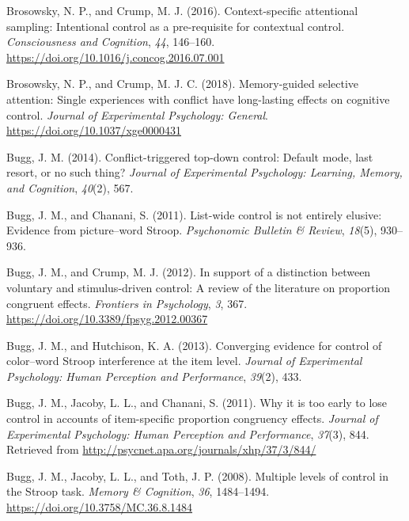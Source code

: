 \documentclass[]{DissertateCUNY}
\begin{document}
\leavevmode\hypertarget{ref-brosowsky_context-specific_2016}{}%
Brosowsky, N. P., and Crump, M. J. (2016). Context-specific attentional
sampling: Intentional control as a pre-requisite for contextual control.
\emph{Consciousness and Cognition}, \emph{44}, 146--160.
\url{https://doi.org/10.1016/j.concog.2016.07.001}

\leavevmode\hypertarget{ref-brosowsky_memory-guided_2018}{}%
Brosowsky, N. P., and Crump, M. J. C. (2018). Memory-guided selective
attention: Single experiences with conflict have long-lasting effects on
cognitive control. \emph{Journal of Experimental Psychology: General}.
\url{https://doi.org/10.1037/xge0000431}

\leavevmode\hypertarget{ref-bugg_conflict-triggered_2014}{}%
Bugg, J. M. (2014). Conflict-triggered top-down control: Default mode,
last resort, or no such thing? \emph{Journal of Experimental Psychology:
Learning, Memory, and Cognition}, \emph{40}(2), 567.

\leavevmode\hypertarget{ref-bugg_list-wide_2011}{}%
Bugg, J. M., and Chanani, S. (2011). List-wide control is not entirely
elusive: Evidence from picture--word Stroop. \emph{Psychonomic Bulletin
\& Review}, \emph{18}(5), 930--936.

\leavevmode\hypertarget{ref-bugg_support_2012}{}%
Bugg, J. M., and Crump, M. J. (2012). In support of a distinction
between voluntary and stimulus-driven control: A review of the
literature on proportion congruent effects. \emph{Frontiers in
Psychology}, \emph{3}, 367.
\url{https://doi.org/10.3389/fpsyg.2012.00367}

\leavevmode\hypertarget{ref-bugg_converging_2013}{}%
Bugg, J. M., and Hutchison, K. A. (2013). Converging evidence for
control of color--word Stroop interference at the item level.
\emph{Journal of Experimental Psychology: Human Perception and
Performance}, \emph{39}(2), 433.

\leavevmode\hypertarget{ref-bugg_why_2011}{}%
Bugg, J. M., Jacoby, L. L., and Chanani, S. (2011). Why it is too early
to lose control in accounts of item-specific proportion congruency
effects. \emph{Journal of Experimental Psychology: Human Perception and
Performance}, \emph{37}(3), 844. Retrieved from
\url{http://psycnet.apa.org/journals/xhp/37/3/844/}

\leavevmode\hypertarget{ref-bugg_multiple_2008}{}%
Bugg, J. M., Jacoby, L. L., and Toth, J. P. (2008). Multiple levels of
control in the Stroop task. \emph{Memory \& Cognition}, \emph{36},
1484--1494. \url{https://doi.org/10.3758/MC.36.8.1484}
\end{document}
